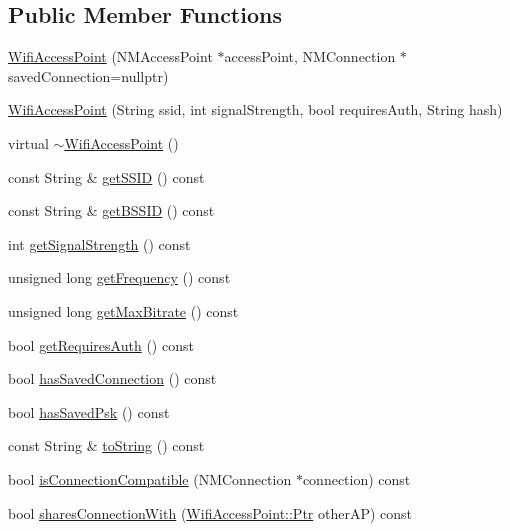 \subsection*{Public Member Functions}
\begin{DoxyCompactItemize}
\item 
\mbox{\hyperlink{classWifiAccessPoint_acc0b9a94250a14d7973141560cf0ab32}{Wifi\+Access\+Point}} (N\+M\+Access\+Point $\ast$access\+Point, N\+M\+Connection $\ast$saved\+Connection=nullptr)
\item 
\mbox{\hyperlink{classWifiAccessPoint_a588334ccd7e0ff60c32229b13df37c17}{Wifi\+Access\+Point}} (String ssid, int signal\+Strength, bool requires\+Auth, String hash)
\item 
virtual \mbox{\hyperlink{classWifiAccessPoint_a808c1c826fc3984fcc589fb810a519ea}{$\sim$\+Wifi\+Access\+Point}} ()
\item 
const String \& \mbox{\hyperlink{classWifiAccessPoint_a5562a8b3c2300307b9ff709c9b689304}{get\+S\+S\+ID}} () const
\item 
const String \& \mbox{\hyperlink{classWifiAccessPoint_a993dc56a7510c6df33a8410b1dcd0139}{get\+B\+S\+S\+ID}} () const
\item 
int \mbox{\hyperlink{classWifiAccessPoint_afa3755f10d1a944484e573b40359f1f6}{get\+Signal\+Strength}} () const
\item 
unsigned long \mbox{\hyperlink{classWifiAccessPoint_a4794580b1fcd5341f18bc8ca14005d8a}{get\+Frequency}} () const
\item 
unsigned long \mbox{\hyperlink{classWifiAccessPoint_a7734b5d2ba0d5dfdb6e8fcb948856794}{get\+Max\+Bitrate}} () const
\item 
bool \mbox{\hyperlink{classWifiAccessPoint_a44a975c477de1605ebda26530f814309}{get\+Requires\+Auth}} () const
\item 
bool \mbox{\hyperlink{classWifiAccessPoint_a5b7b4e337bf671c9c9ce2cbfbe69d8a2}{has\+Saved\+Connection}} () const
\item 
bool \mbox{\hyperlink{classWifiAccessPoint_ac6c7f51b3a1145882363bfbfde8c1cd8}{has\+Saved\+Psk}} () const
\item 
const String \& \mbox{\hyperlink{classWifiAccessPoint_a1ff885572752abf221ca77e8a619e610}{to\+String}} () const
\item 
bool \mbox{\hyperlink{classWifiAccessPoint_ace8773ced0e39ecf90e5716e630cf066}{is\+Connection\+Compatible}} (N\+M\+Connection $\ast$connection) const
\item 
bool \mbox{\hyperlink{classWifiAccessPoint_a399a048b0fe892e43f5573d693ced740}{shares\+Connection\+With}} (\mbox{\hyperlink{classWifiAccessPoint_ad18977f884076774803027efbaa131a0}{Wifi\+Access\+Point\+::\+Ptr}} other\+AP) const

\end{DoxyCompactItemize}
